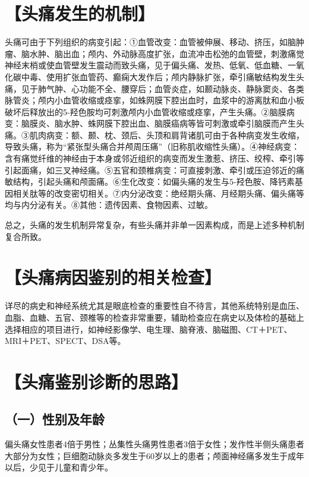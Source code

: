 \begin{longtable}{c}
 \end{longtable}

\section{【头痛发生的机制】}

头痛可由于下列组织的病变引起：①血管改变：血管被伸展、移动、挤压，如脑肿瘤、脑水肿、脑出血；颅内、外动脉高度扩张，血流冲击松弛的血管壁，刺激痛觉神经末梢或使血管壁发生震动而致头痛，见于偏头痛、发热、低氧、低血糖、一氧化碳中毒、使用扩张血管药、癫痫大发作后；颅内静脉扩张，牵引痛敏结构发生头痛，见于肺气肿、心功能不全、腰穿后；血管炎症，如颞动脉炎、静脉窦炎、各类脉管炎；颅内小血管收缩或痉挛，如蛛网膜下腔出血时，血浆中的游离肽和血小板破坏后释放出的5-羟色胺均可刺激颅内小血管收缩或痉挛，产生头痛。②脑膜病变：脑膜炎、脑水肿、蛛网膜下腔出血、脑膜癌病等皆可刺激或牵引脑膜而产生头痛。③肌肉病变：额、颞、枕、颈后、头顶和肩背诸肌可由于各种病变发生收缩，导致头痛，称为“紧张型头痛合并颅周压痛”（旧称肌收缩性头痛）。④神经病变：含有痛觉纤维的神经由于本身或邻近组织的病变而发生激惹、挤压、绞榨、牵引等引起面痛，如三叉神经痛。⑤五官和颈椎病变：可直接刺激、牵引或压迫邻近的痛敏结构，引起头痛和颅面痛。⑥生化改变：如偏头痛的发生与5-羟色胺、降钙素基因相关肽等的改变密切相关。⑦内分泌改变：绝经期头痛、月经期头痛、偏头痛等均与内分泌有关。⑧其他：遗传因素、食物因素、过敏。

总之，头痛的发生机制异常复杂，有些头痛并非单一因素构成，而是上述多种机制复合所致。

\section{【头痛病因鉴别的相关检查】}

详尽的病史和神经系统尤其是眼底检查的重要性自不待言，其他系统特别是血压、血脂、血糖、五官、颈椎等的检查非常重要，辅助检查应在病史以及体检的基础上选择相应的项目进行，如神经影像学、电生理、脑脊液、脑磁图、CT＋PET、MRI＋PET、SPECT、DSA等。

\section{【头痛鉴别诊断的思路】}

\subsection{（一）性别及年龄}

偏头痛女性患者4倍于男性；丛集性头痛男性患者3倍于女性；发作性半侧头痛患者大部分为女性；巨细胞动脉炎多发生于60岁以上的患者；颅面神经痛多发生于成年以后，少见于儿童和青少年。

